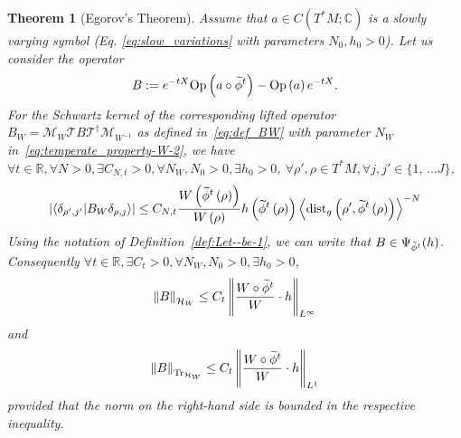\documentclass[10pt]{amsart}
\newtheorem{theo}{Theorem}[section]
\theoremstyle{definition}\newtheorem{defi}[theo]{Definition}\newtheorem{rema}[theo]{Remark}\newtheorem{exam}[theo]{Example}\newtheorem{exem}[theo]{Example}\newtheorem{nota}[theo]{Notation}
\newcommand{\clT}{\mathcal{T}}
\newcommand{\clH}{\mathcal{H}}
\newcommand{\clM}{\mathcal{M}}
\newcommand{\dist}{\mathrm{dist}}
\newcommand{\Opp}{\mathrm{Op}}
\newcommand{\Tr}{\mathrm{Tr}}
\newcommand{\bbR}{\mathbb{R}}
\newcommand{\bbC}{\mathbb{C}}
\let\oldtilde\tilde
\renewcommand*{\tilde}[1]{\mathchoice{\widetilde{#1}}{\widetilde{#1}}{\oldtilde{#1}}{\oldtilde{#1}}}
\let\oldexists\exists
\renewcommand*{\exists}{\mathrel{\oldexists}}
\let\oldforall\forall
\renewcommand*{\forall}{\mathrel{\oldforall}}
\begin{document}
\begin{tcolorbox}[enhanced, frame style={teal!80}, interior style={cyan!0}, breakable]
\begin{theo}[Egorov's Theorem]\label{thm:Egorov.-For-any}
Assume that $a\in C(T^{*}M;\bbC)$ is a slowly varying symbol (Eq. \eqref{eq:slow_variations} with parameters $N_{0},h_{0}>0$). Let us consider the operator
\[
B:=e^{-tX}\Opp \left(a\circ\tilde{\phi}^{t}\right)-\Opp \left(a\right)e^{-tX}.
\]
For the Schwartz kernel of the corresponding lifted operator $B_{W}=\clM_{W}\clT B\clT^{\dagger}\clM_{W^{-1}}$ as defined in~\eqref{eq:def_BW} with parameter $N_{W}$ in~\eqref{eq:temperate_property-W-2}, we have $\forall t\in\bbR,\forall N>0,\exists C_{N,t}>0,\forall N_{W},N_{0}>0,\exists h_{0}>0$, $\forall\rho',\rho\in T^{*}M,\forall j,j'\in\{ 1,\,\ldots J\} $,
\[
\left|\langle\delta_{\rho',j'}|B_{W}\delta_{\rho,j}\rangle\right|\leq C_{N,t}\frac{W\left(\tilde{\phi}^{t}\left(\rho\right)\right)}{W\left(\rho\right)}h\left(\tilde{\phi}^{t}\left(\rho\right)\right)\left\langle \dist_{g}\left(\rho',\tilde{\phi}^{t}\left(\rho\right)\right)\right\rangle ^{-N}
\]
Using the notation of Definition~\ref{def:Let--be-1}, we can write that $B\in\Psi_{\tilde{\phi}^{t}}(h)$. Consequently $\forall t\in\bbR,\exists C_{t}>0,\forall N_{W},N_{0}>0,\exists h_{0}>0$,
\begin{equation}\label{eq:norm_Egorov_PDO}
\left\Vert B\right\Vert _{\clH _{W}}\leq C_{t}\left\Vert \frac{W\circ\tilde{\phi}^{t}}{W}\cdot h\right\Vert _{L^{\infty}}
\end{equation}
and
\begin{equation}\label{eq:Egorov_Trace}
\left\Vert B\right\Vert _{\Tr_{\clH _{W}}}\leq C_{t}\left\Vert \frac{W\circ\tilde{\phi}^{t}}{W}\cdot h\right\Vert _{L^{1}}
\end{equation}
provided that the norm on the right-hand side is bounded in the respective inequality.
\end{theo}
\end{tcolorbox}
\end{document}
